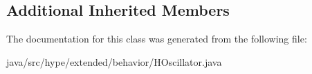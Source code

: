 \subsection*{Additional Inherited Members}


The documentation for this class was generated from the following file\-:\begin{DoxyCompactItemize}
\item 
java/src/hype/extended/behavior/H\-Oscillator.\-java\end{DoxyCompactItemize}
